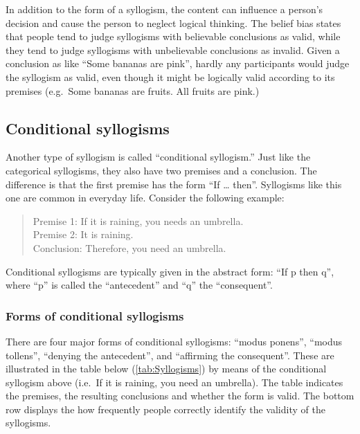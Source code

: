 \documentclass[
]{krantz}
\begin{document}
In addition to the form of a syllogism, the content can influence a person's decision and cause the person to neglect logical thinking. The belief bias states that people tend to judge syllogisms with believable conclusions as valid, while they tend to judge syllogisms with unbelievable conclusions as invalid. Given a conclusion as like ``Some bananas are pink'', hardly any participants would judge the syllogism as valid, even though it might be logically valid according to its premises (e.g.~Some bananas are fruits. All fruits are pink.)

\subsection*{Conditional syllogisms}\label{conditional-syllogisms}


Another type of syllogism is called ``conditional syllogism.'' Just like the categorical syllogisms, they also have two premises and a conclusion. The difference is that the first premise has the form ``If \ldots{} then''. Syllogisms like this one are common in everyday life. Consider the following example:

\begin{quote}
Premise 1: If it is raining, you needs an umbrella.\\
Premise 2: It is raining.\\
Conclusion: Therefore, you need an umbrella.
\end{quote}

Conditional syllogisms are typically given in the abstract form: ``If p then q'', where ``p'' is called the ``antecedent'' and ``q'' the ``consequent''.

\subsubsection*{Forms of conditional syllogisms}\label{forms-of-conditional-syllogisms}


There are four major forms of conditional syllogisms: ``modus ponens'', ``modus tollens'', ``denying the antecedent'', and ``affirming the consequent''. These are illustrated in the table below (\ref{tab:Syllogisms}) by means of the conditional syllogism above (i.e.~If it is raining, you need an umbrella). The table indicates the premises, the resulting conclusions and whether the form is valid. The bottom row displays the how frequently people correctly identify the validity of the syllogisms.
\end{document}
